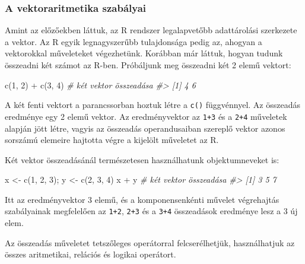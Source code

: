 \documentclass[
]{book}
\newenvironment{Shaded}{\begin{snugshade}}{\end{snugshade}}
\newcommand{\CommentTok}[1]{\textcolor[rgb]{0.56,0.35,0.01}{\textit{#1}}}
\newcommand{\DecValTok}[1]{\textcolor[rgb]{0.00,0.00,0.81}{#1}}
\newcommand{\FunctionTok}[1]{\textcolor[rgb]{0.00,0.00,0.00}{#1}}
\newcommand{\NormalTok}[1]{#1}
\newcommand{\OtherTok}[1]{\textcolor[rgb]{0.56,0.35,0.01}{#1}}
\newcommand{\SpecialCharTok}[1]{\textcolor[rgb]{0.00,0.00,0.00}{#1}}
\begin{document}
\hypertarget{a-vektoraritmetika-szabuxe1lyai}{%
\subsubsection{A vektoraritmetika szabályai}\label{a-vektoraritmetika-szabuxe1lyai}}

Amint az előzőekben láttuk, az R rendszer legalapvetőbb adattárolási szerkezete a vektor. Az R egyik legnagyszerűbb tulajdonsága pedig az, ahogyan a vektorokkal műveleteket végezhetünk. Korábban már láttuk, hogyan tudunk összeadni két számot az R-ben. Próbáljunk meg összeadni két 2 elemű vektort:

\begin{Shaded}
\begin{Highlighting}[]
\FunctionTok{c}\NormalTok{(}\DecValTok{1}\NormalTok{, }\DecValTok{2}\NormalTok{) }\SpecialCharTok{+} \FunctionTok{c}\NormalTok{(}\DecValTok{3}\NormalTok{, }\DecValTok{4}\NormalTok{) }\CommentTok{\# két vektor összeadása}
\CommentTok{\#\textgreater{} [1] 4 6}
\end{Highlighting}
\end{Shaded}

A két fenti vektort a parancssorban hoztuk létre a \texttt{c()} függvénnyel. Az összeadás eredménye egy 2 elemű vektor. Az eredményvektor az \texttt{1+3} és a \texttt{2+4} műveletek alapján jött létre, vagyis az összeadás operandusaiban szereplő vektor azonos sorszámú elemeire hajtotta végre a kijelölt műveletet az R.

Két vektor összeadásánál természetesen használhatunk objektumneveket is:

\begin{Shaded}
\begin{Highlighting}[]
\NormalTok{x }\OtherTok{\textless{}{-}} \FunctionTok{c}\NormalTok{(}\DecValTok{1}\NormalTok{, }\DecValTok{2}\NormalTok{, }\DecValTok{3}\NormalTok{); y }\OtherTok{\textless{}{-}} \FunctionTok{c}\NormalTok{(}\DecValTok{2}\NormalTok{, }\DecValTok{3}\NormalTok{, }\DecValTok{4}\NormalTok{)}
\NormalTok{x }\SpecialCharTok{+}\NormalTok{ y }\CommentTok{\# két vektor összeadása}
\CommentTok{\#\textgreater{} [1] 3 5 7}
\end{Highlighting}
\end{Shaded}

Itt az eredményvektor 3 elemű, és a komponensenkénti művelet végrehajtás szabályainak megfelelően az \texttt{1+2}, \texttt{2+3} és a \texttt{3+4} összeadások eredménye lesz a 3 új elem.

Az összeadás műveletet tetszőleges operátorral felcserélhetjük, használhatjuk az összes aritmetikai, relációs és logikai operátort.
\end{document}
